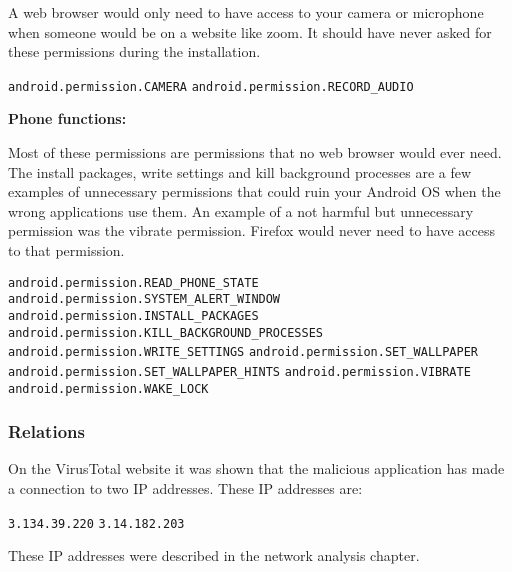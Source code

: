 A web browser would only need to have access to your camera or microphone when someone would be on a website like zoom. It should have never asked for these permissions during the installation. 

\texttt{android.permission.CAMERA}
\newline \texttt{android.permission.RECORD\_AUDIO}

\newpage
\textbf{Phone functions:}

Most of these permissions are permissions that no web browser would ever need. The install packages, write settings and kill background processes are a few examples of unnecessary permissions that could ruin your Android OS when the wrong applications use them. An example of a not harmful but unnecessary permission was the vibrate permission. Firefox would never need to have access to that permission.

\texttt{android.permission.READ\_PHONE\_STATE}
\newline \texttt{android.permission.SYSTEM\_ALERT\_WINDOW}
\newline \texttt{android.permission.INSTALL\_PACKAGES}
\newline \texttt{android.permission.KILL\_BACKGROUND\_PROCESSES}
\newline \texttt{android.permission.WRITE\_SETTINGS}
\newline \texttt{android.permission.SET\_WALLPAPER}
\newline \texttt{android.permission.SET\_WALLPAPER\_HINTS}
\newline \texttt{android.permission.VIBRATE}
\newline \texttt{android.permission.WAKE\_LOCK}

\subsubsection{Relations}
On the VirusTotal website it was shown that the malicious application has made a connection to two IP addresses. These IP addresses are:

\texttt{3.134.39.220}
\newline \texttt{3.14.182.203}

These IP addresses were described in the network analysis chapter.